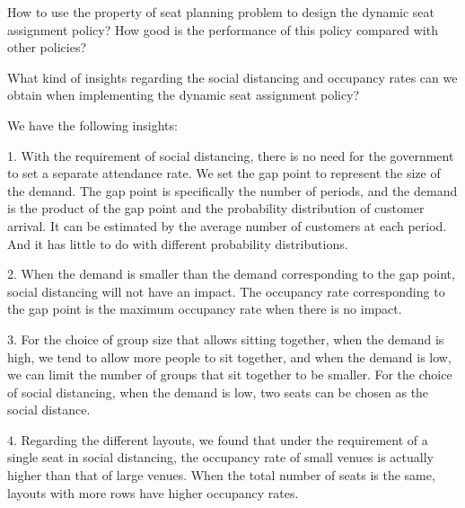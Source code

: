 How to use the property of seat planning problem to design the dynamic seat assignment policy? How good is the performance of this policy compared with other policies?

What kind of insights regarding the social distancing and occupancy rates can we obtain when implementing the dynamic seat assignment policy?


We have the following insights:

1.  With the requirement of social distancing, there is no need for the government to set a separate attendance rate. We set the gap point to represent the size of the demand. The gap point is specifically the number of periods, and the demand is the product of the gap point and the probability distribution of customer arrival. It can be estimated by the average number of customers at each period. And it has little to do with different probability distributions.

2. When the demand is smaller than the demand corresponding to the gap point, social distancing will not have an impact. The occupancy rate corresponding to the gap point is the maximum occupancy rate when there is no impact.

3.  For the choice of group size that allows sitting together, when the demand is high, we tend to allow more people to sit together, and when the demand is low, we can limit the number of groups that sit together to be smaller. For the choice of social distancing, when the demand is low, two seats can be chosen as the social distance.

4.  Regarding the different layouts, we found that under the requirement of a single seat in social distancing, the occupancy rate of small venues is actually higher than that of large venues. When the total number of seats is the same, layouts with more rows have higher occupancy rates.




